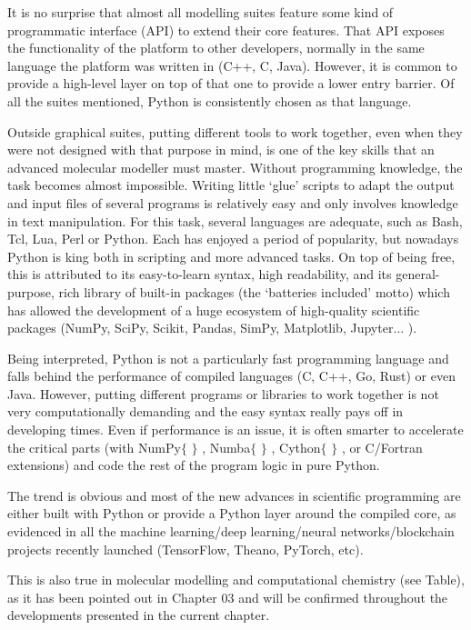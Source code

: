 It is no surprise that almost all modelling suites feature some kind of programmatic interface (API) to extend their core features. That API exposes the functionality of the platform to other developers, normally in the same language the platform was written in (C++, C, Java). However, it is common to provide a high-level layer on top of that one to provide a lower entry barrier. Of all the suites mentioned, Python is consistently chosen as that language.

Outside graphical suites, putting different tools to work together, even when they were not designed with that purpose in mind, is one of the key skills that an advanced molecular modeller must master. Without programming knowledge, the task becomes almost impossible. Writing little ‘glue’ scripts to adapt the output and input files of several programs is relatively easy and only involves knowledge in text manipulation. For this task, several languages are adequate, such as Bash, Tcl, Lua, Perl or Python. Each has enjoyed a period of popularity, but nowadays Python is king both in scripting and more advanced tasks. On top of being free, this is attributed to its easy-to-learn syntax, high readability, and its general-purpose, rich library of built-in packages (the ‘batteries included’ motto) which has allowed the development of a huge ecosystem of high-quality scientific packages (NumPy, SciPy, Scikit, Pandas, SimPy, Matplotlib, Jupyter$ \ldots $ ).

Being interpreted, Python is not a particularly fast programming language and falls behind the performance of compiled languages (C, C++, Go, Rust) or even Java. However, putting different programs or libraries to work together is not very computationally demanding and the easy syntax really pays off in developing times. Even if performance is an issue, it is often smarter to accelerate the critical parts (with NumPy$ \{ $ $ \} $ , Numba$ \{ $ $ \} $ , Cython$ \{ $ $ \} $ , or C/Fortran extensions) and code the rest of the program logic in pure Python.

The trend is obvious and most of the new advances in scientific programming are either built with Python or provide a Python layer around the compiled core, as evidenced in all the machine learning/deep learning/neural networks/blockchain projects recently launched (TensorFlow, Theano, PyTorch, etc).

This is also true in molecular modelling and computational chemistry (see Table), as it has been pointed out in Chapter 03 and will be confirmed throughout the developments presented in the current chapter.

